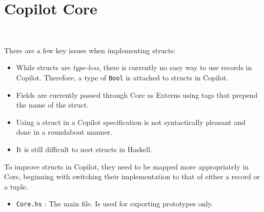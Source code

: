 \section{Copilot Core}~\label{sec:core}




There are a few key issues when implementing structs:
\begin{itemize}
	\item
	While structs are \emph{type-less}, there is currently no easy way to use records in Copilot. Therefore, a type of \texttt{Bool} is attached to structs in Copilot.
	\item
	Fields are currently passed through Core as Externs using tags that prepend the name of the struct.
	\item
	Using a struct in a Copilot specification is not syntactically pleasant and done in a roundabout manner.
	\item
	It is still difficult to nest structs in Haskell.
\end{itemize}
To improve structs in Copilot, they need to be mapped more appropriately in Core, beginning with switching their implementation to that of either a record or a tuple.

\begin{itemize}
	\item \texttt{Core.hs} : The main file. Is used for exporting prototypes only.
\end{itemize}

